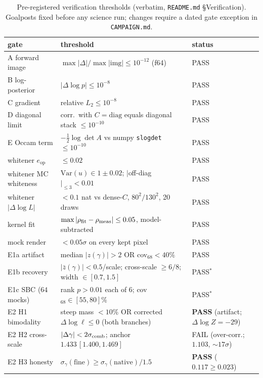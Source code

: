 \documentclass[11pt,letterpaper]{article}
\newcommand{\gammaEPL}{\ensuremath{\gamma}}
\newcommand{\eop}{\ensuremath{e_{\mathrm{op}}}}
\begin{document}
\begin{table}[ht]
\centering
\caption{Pre-registered verification thresholds (verbatim, \texttt{README.md}
\S Verification). Goalposts fixed before any science run; changes require a
dated gate exception in \texttt{CAMPAIGN.md}.}
\label{tab:thresholds}
\small
\begin{tabular}{lll}
\toprule
gate & threshold & status \\
\midrule
A forward image        & $\max|\Delta|/\max|\mathrm{img}|\le10^{-12}$ (f64) & PASS \\
B log-posterior        & $|\Delta\log p|\le10^{-8}$ & PASS \\
C gradient             & relative $L_2\le10^{-8}$ & PASS \\
D diagonal limit       & corr.\ with $C=\mathrm{diag}$ equals diagonal stack $\le10^{-10}$ & PASS \\
E Occam term           & $-\tfrac12\log\det A$ vs numpy \texttt{slogdet} $\le10^{-10}$ & PASS \\
\midrule
whitener $\eop$        & $\le0.02$ & PASS \\
whitener MC whiteness  & $\mathrm{Var}(u)\in1\pm0.02$; $|$off-diag$|_{\le3}<0.01$ & PASS \\
whitener $|\Delta\log L|$ & $<0.1$ nat vs dense-$C$, $80^2/130^2$, 20 draws & PASS \\
kernel fit             & $\max|\rho_{\rm fit}-\rho_{\rm meas}|\le0.05$, model-subtracted & PASS \\
mock render            & $<0.05\sigma$ on every kept pixel & PASS \\
E1a artifact           & median $|z(\gammaEPL)|>2$ OR cov$_{68}<40\%$ & PASS \\
E1b recovery           & $|\bar z(\gammaEPL)|<0.5$/scale; cross-scale $\ge6/8$; width $\in[0.7,1.5]$ & PASS$^\ast$ \\
E1c SBC ($64$ mocks)   & rank $p>0.01$ each of $6$; cov$_{68}\in[55,80]\%$ & PASS$^\ast$ \\
E2 H1 bimodality       & steep mass $<10\%$ OR corrected $\Delta\log\ell\le0$ (both branches) & {\bf PASS} (artifact; $\Delta\!\log Z{=}{-}29$) \\
E2 H2 cross-scale      & $|\Delta\gammaEPL|<2\sigma_{\rm comb}$; anchor $1.433\,[1.400,1.469]$ & FAIL (over-corr.; $1.103$, ${\sim}17\sigma$) \\
E2 H3 honesty          & $\sigma_\gamma(\text{fine})\ge\sigma_\gamma(\text{native})/1.5$ & {\bf PASS} ($0.117{\ge}0.023$) \\

\end{tabular}
\end{table}
\end{document}
